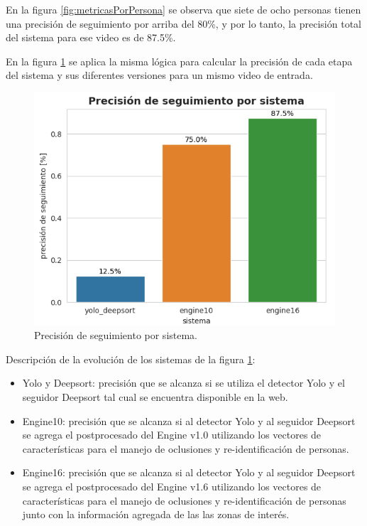 En la figura \ref{fig:metricasPorPersona} se observa que siete de ocho personas tienen una precisión de seguimiento por arriba del 80\%, y por lo tanto, la precisión total del sistema para ese video es de 87.5\%. 

En la figura \ref{fig:metricasPorSistema} se aplica la misma lógica para calcular la precisión de cada etapa del sistema y sus diferentes versiones para un mismo video de entrada.

\newpage

\begin{figure}[ht]
	\centering
	\includegraphics[scale=.80]{./Figures/metricasPorSistema.png}
	\caption{Precisión de seguimiento por sistema.}
	\label{fig:metricasPorSistema}
\end{figure}

Descripción de la evolución de los sistemas de la figura \ref{fig:metricasPorSistema}:
\begin{itemize}
\item Yolo y Deepsort: precisión que se alcanza si se utiliza el detector Yolo y el seguidor Deepsort tal cual se encuentra disponible en la web.
\item Engine10: precisión que se alcanza si al detector Yolo y al seguidor Deepsort se agrega el postprocesado del Engine v1.0 utilizando los vectores de características para el manejo de oclusiones y re-identificación de personas.
\item Engine16: precisión que se alcanza si al detector Yolo y al seguidor Deepsort se agrega el postprocesado del Engine v1.6 utilizando los vectores de características para el manejo de oclusiones y re-identificación de personas junto con la información agregada de las las zonas de interés.
\end{itemize}


